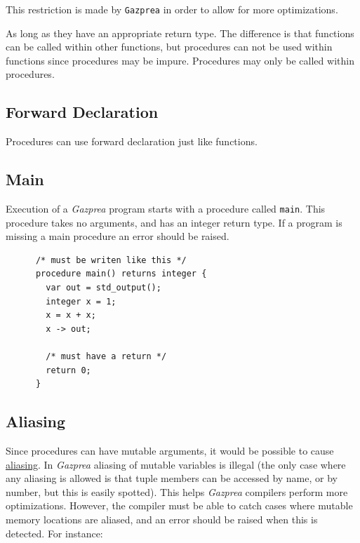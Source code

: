 \documentclass{article}
\begin{document}
    This restriction is made by \texttt{Gazprea} in order to allow for more optimizations.

    As long as they have an appropriate return type. The difference is that functions can be called within other
    functions, but procedures can not be used within functions since procedures may be impure. Procedures may only
    be called within procedures.


\subsection{Forward Declaration}

  Procedures can use forward declaration just like functions.


  \subsection{Main}

    Execution of a \textit{Gazprea} program starts with a procedure called \texttt{main}. This procedure takes no
    arguments, and has an integer return type. If a program is missing a main procedure an error should be raised.

    \begin{lstlisting}
      /* must be writen like this */
      procedure main() returns integer {
        var out = std_output();
        integer x = 1;
        x = x + x;
        x -> out;

        /* must have a return */
        return 0;
      }
    \end{lstlisting}

  \subsection{Aliasing}

    Since procedures can have mutable arguments, it would be possible to cause
    \href{http://en.wikipedia.org/wiki/Aliasing_(computing)}{aliasing}. In \textit{Gazprea} aliasing of mutable
    variables is illegal (the only case where any aliasing is allowed is that tuple members can be accessed by name,
    or by number, but this is easily spotted). This helps \textit{Gazprea} compilers perform more optimizations.
    However, the compiler must be able to catch cases where mutable memory locations are aliased, and an error
    should be raised when this is detected. For instance:
\end{document}
